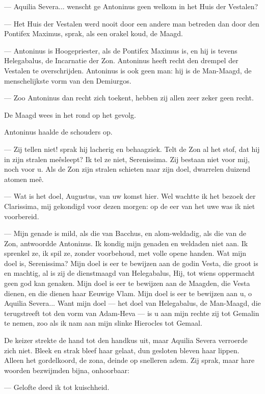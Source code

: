 \documentclass[a4paper, 12pt, oneside, dutch]{article}
\begin{document}
--- Aquilia Severa... wenscht ge Antoninus geen welkom in het Huis der Vestalen?

--- Het Huis der Vestalen werd nooit door een andere man betreden dan door den Pontifex Maximus, sprak, als een orakel koud, de Maagd.

--- Antoninus is Hoogepriester, als de Pontifex Maximus is, en hij is tevens Helegabalus, de Incarnatie der Zon. Antoninus heeft recht den drempel der Vestalen te overschrijden. Antoninus is ook geen man: hij is de Man-Maagd, de menschelijkste vorm van den Demiurgos.

--- Zoo Antoninus dan recht zich toekent, hebben zij allen zeer zeker geen recht.

De Maagd wees in het rond op het gevolg.

Antoninus haalde de schouders op.

--- Zij tellen niet! sprak hij lacherig en behaagziek. Telt de Zon al het stof, dat hij in zijn stralen meêsleept? Ik tel ze niet, Serenissima. Zij bestaan niet voor mij, noch voor u. Als de Zon zijn stralen schieten naar zijn doel, dwarrelen duizend atomen meê.

--- Wat is het doel, Augustus, van uw komst hier. Wel wachtte ik het bezoek der Clarissima, mij gekondigd voor dezen morgen: op de eer van het uwe was ik niet voorbereid.

--- Mijn genade is mild, als die van Bacchus, en alom-weldadig, als die van de Zon, antwoordde Antoninus. Ik kondig mijn genaden en weldaden niet aan. Ik sprenkel ze, ik spil ze, zonder voorbehoud, met volle opene handen. Wat mijn doel is, Serenissima? Mijn doel is eer te bewijzen aan de godin Vesta, die groot is en machtig, al is zij de dienstmaagd van Helegabalus, Hij, tot wiens oppermacht geen god kan genaken. Mijn doel is eer te bewijzen aan de Maagden, die Vesta dienen, en die dienen haar Eeuwige Vlam. Mijn doel is eer te bewijzen aan u, o Aquilia Severa... Want mijn doel --- het doel van Helegabalus, de Man-Maagd, die terugstreeft tot den vorm van Adam-Heva --- is u aan mijn rechte zij tot Gemalin te nemen, zoo als ik nam aan mijn slinke Hierocles tot Gemaal.

De keizer strekte de hand tot den handkus uit, maar Aquilia Severa verroerde zich niet. Bleek en strak bleef haar gelaat, dun gesloten bleven haar lippen. Alleen het gordelkoord, de zona, deinde op snelleren adem. Zij sprak, maar hare woorden bezwijmden bijna, onhoorbaar:

--- Gelofte deed ik tot kuischheid.
\end{document}
